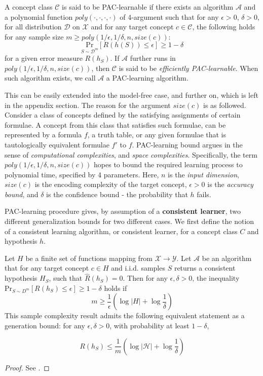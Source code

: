 \documentclass[10pt]{article}
\begin{document}
\begin{definition}
    A concept class $\mathcal{C}$ is said to be PAC-learnable if there exists an algorithm $\mathcal{A}$ and a polynomial function $poly(\cdot,\cdot,\cdot,\cdot)$ of 4-argument such that for any $\epsilon>0$, $\delta>0$, for all distribution $\mathcal{D}$ on $\mathcal{X}$ and for any target concept $c\in\mathcal{C}$, the following holds for any sample size $m\geq poly(1/\epsilon,1/\delta,n,size(c))$: $$\underset{S\sim \mathcal{D}^{m}}{\mathrm{Pr}}\left[ R(h(S))\leq \epsilon \right]\geq 1-\delta$$
    for a given error measure $R(h_{S})$. If $\mathcal{A}$ further runs in $poly(1/\epsilon,1/\delta,n,size(c))$, then $\mathcal{C}$ is said to be \textit{efficiently PAC-learnable}. When such algorithm exists, we call $\mathcal{A}$ a PAC-learning algorithm. 
\end{definition}
This can be easily extended into the model-free case, and further on, which is left in the appendix section. The reason for the argument $size(c)$ is as followed. Consider a class of concepts defined by the satisfying assignments of certain formulae. A concept from this class that satisfies such formulae, can be represented by a formula $f$, a truth table, or any given formulae that is tautologically equivalent formulae $f'$ to $f$. PAC-learning bound argues in the sense of \textit{computational complexities}, and \textit{space complexities}. Specifically, the term $poly(1/\epsilon,1/\delta,n,size(c))$ hopes to bound the required learning process to polynomial time, specified by 4 parameters. Here, $n$ is the \textit{input dimension}, $size(c)$ is the encoding complexity of the target concept, $\epsilon>0$ is the \textit{accuracy bound}, and $\delta$ is the confidence bound - the probability that $h$ fails.

PAC-learning procedure gives, by assumption of a \textbf{consistent learner}, two different generalization bounds for two different cases. We first define the notion of a consistent learning algorithm, or consistent learner, for a concept class $C$ and hypothesis $h$. 

\begin{theorem}
    Let $H$ be a finite set of functions mapping from $\mathcal{X}\to \mathcal{Y}$. Let $\mathcal{A}$ be an algorithm that for any target concept $c\in H$ and i.i.d. samples $S$ returns a consistent hypothesis $H_{S}$, such that $\hat{R}(h_{S}) = 0$. Then for any  $\epsilon,\delta>0$, the inequality $\mathrm{Pr}_{S\sim D^{m}}[R(h_{S})\leq \epsilon]\geq 1-\delta$ holds if $$m\geq \frac{1}{\epsilon}\left( \log{\lvert H \rvert }+\log{\frac{1}{\delta}} \right)$$
This sample complexity result admits the following equivalent statement as a generation bound: for any $\epsilon,\delta>0$, with probability at least $1-\delta$, 

\begin{equation}
    R(h_S) \leq \frac{1}{m} \left( \log{|\mathcal{H}|} + \log{\frac{1}{\delta}} \right)
\end{equation}
\end{theorem}
\begin{proof}
    See \cite{10.5555/2371238}.
\end{proof}
\end{document}
